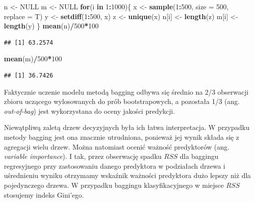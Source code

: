 \documentclass[]{book}
\newenvironment{Shaded}{\begin{snugshade}}{\end{snugshade}}
\newcommand{\ControlFlowTok}[1]{\textcolor[rgb]{0.13,0.29,0.53}{\textbf{#1}}}
\newcommand{\DataTypeTok}[1]{\textcolor[rgb]{0.13,0.29,0.53}{#1}}
\newcommand{\DecValTok}[1]{\textcolor[rgb]{0.00,0.00,0.81}{#1}}
\newcommand{\KeywordTok}[1]{\textcolor[rgb]{0.13,0.29,0.53}{\textbf{#1}}}
\newcommand{\NormalTok}[1]{#1}
\newcommand{\OperatorTok}[1]{\textcolor[rgb]{0.81,0.36,0.00}{\textbf{#1}}}
\newcommand{\OtherTok}[1]{\textcolor[rgb]{0.56,0.35,0.01}{#1}}
\newcommand{\StringTok}[1]{\textcolor[rgb]{0.31,0.60,0.02}{#1}}
\theoremstyle{plain}
\theoremstyle{definition}
\theoremstyle{definition}
\theoremstyle{definition}
\theoremstyle{definition}
\theoremstyle{remark}
\begin{document}
\begin{Shaded}
\begin{Highlighting}[]
\NormalTok{n <-}\StringTok{ }\OtherTok{NULL}
\NormalTok{m <-}\StringTok{ }\OtherTok{NULL}
\ControlFlowTok{for}\NormalTok{(i }\ControlFlowTok{in} \DecValTok{1}\OperatorTok{:}\DecValTok{1000}\NormalTok{)\{}
\NormalTok{    x <-}\StringTok{ }\KeywordTok{sample}\NormalTok{(}\DecValTok{1}\OperatorTok{:}\DecValTok{500}\NormalTok{, }\DataTypeTok{size =} \DecValTok{500}\NormalTok{, }\DataTypeTok{replace =}\NormalTok{ T)}
\NormalTok{    y <-}\StringTok{ }\KeywordTok{setdiff}\NormalTok{(}\DecValTok{1}\OperatorTok{:}\DecValTok{500}\NormalTok{, x)}
\NormalTok{    z <-}\StringTok{ }\KeywordTok{unique}\NormalTok{(x)}
\NormalTok{    n[i] <-}\StringTok{ }\KeywordTok{length}\NormalTok{(z)}
\NormalTok{    m[i] <-}\StringTok{ }\KeywordTok{length}\NormalTok{(y)}
\NormalTok{\}}
\KeywordTok{mean}\NormalTok{(n)}\OperatorTok{/}\DecValTok{500}\OperatorTok{*}\DecValTok{100}
\end{Highlighting}
\end{Shaded}

\begin{verbatim}
## [1] 63.2574
\end{verbatim}

\begin{Shaded}
\begin{Highlighting}[]
\KeywordTok{mean}\NormalTok{(m)}\OperatorTok{/}\DecValTok{500}\OperatorTok{*}\DecValTok{100}
\end{Highlighting}
\end{Shaded}

\begin{verbatim}
## [1] 36.7426
\end{verbatim}

Faktycznie uczenie modelu metodą bagging odbywa się średnio na 2/3 obserwacji zbioru uczącego wylosowanych do prób bootstrapowych, a pozostała 1/3 (ang. \emph{out-of-bag}) jest wykorzystana do oceny jakości predykcji.

Niewątpliwą zaletą drzew decyzyjnych była ich łatwa interpretacja. W przypadku metody bagging jest ona znacznie utrudniona, ponieważ jej wynik składa się z agregacji wielu drzew. Można natomiast ocenić ważność predyktorów (ang. \emph{variable importance}). I tak, przez obserwację spadku \(RSS\) dla baggingu regresyjnego przy zastosowaniu danego predyktora w podziałach drzewa i uśrednieniu wyniku otrzymamy wskaźnik ważności predyktora dużo lepszy niż dla pojedynczego drzewa. W przypadku baggingu klasyfikacyjnego w miejsce \(RSS\) stosujemy indeks Gini'ego.
\end{document}
